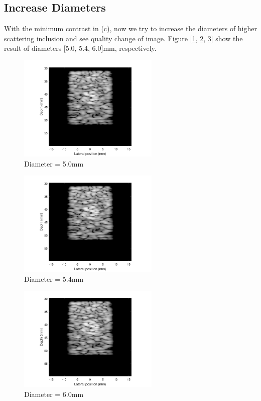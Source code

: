 \documentclass{article}
\begin{document}
\subsection{Increase Diameters}
With the minimum contrast in (c), now we try to increase the diameters of higher scattering inclusion and see quality change of image.
Figure [\ref{fig:radius-25}, \ref{fig:radius-27}, \ref{fig:radius-30}] show the result of diameters [5.0, 5.4, 6.0]mm, respectively.
\begin{figure}[H]
	\centering
	\includegraphics[width = 0.6\textwidth]{src/radius_25.pdf}
	\caption{Diameter = 5.0mm}
	\label{fig:radius-25}
\end{figure}
\begin{figure}[H]
	\centering
	\includegraphics[width = 0.6\textwidth]{src/radius_27.pdf}
	\caption{Diameter = 5.4mm}
	\label{fig:radius-27}
\end{figure}
\begin{figure}[H]
	\centering
	\includegraphics[width = 0.6\textwidth]{src/radius_30.pdf}
	\caption{Diameter = 6.0mm}
	\label{fig:radius-30}
\end{figure}
\end{document}
